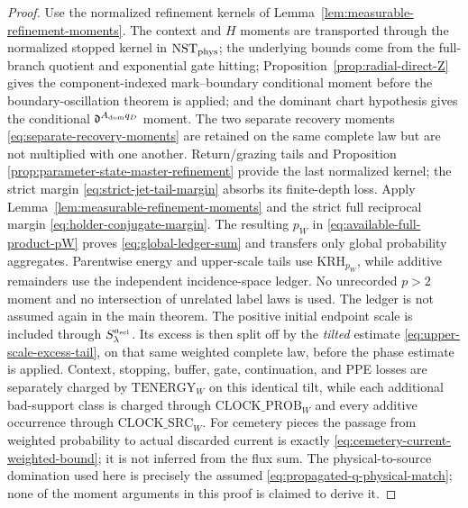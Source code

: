 \documentclass[11pt]{article}
\begin{document}
\begin{proof}
Use the normalized refinement kernels of
Lemma~\ref{lem:measurable-refinement-moments}.  The context and $H$ moments
are transported through the normalized stopped kernel in
$\mathrm{NST}_{\rm phys}$; the underlying bounds come from the full-branch
quotient and exponential gate hitting;
Proposition~\ref{prop:radial-direct-Z} gives the component-indexed
mark--boundary conditional moment before the boundary-oscillation theorem is
applied; and the dominant chart hypothesis gives the conditional
$\mathfrak d^{A_{\rm dom}q_D}$ moment.  The two separate recovery moments
\eqref{eq:separate-recovery-moments} are retained on the same complete law
but are not multiplied with one another.  Return/grazing tails and Proposition
\ref{prop:parameter-state-master-refinement} provide the last normalized
kernel; the strict margin \eqref{eq:strict-jet-tail-margin} absorbs its
finite-depth loss.  Apply Lemma~\ref{lem:measurable-refinement-moments} and
the strict full reciprocal margin \eqref{eq:holder-conjugate-margin}.  The
resulting $p_W$ in \eqref{eq:available-full-product-pW} proves
\eqref{eq:global-ledger-sum} and transfers only global probability
aggregates.  Parentwise energy and upper-scale tails use
$\mathrm{KRH}_{p_W}$, while additive remainders use the independent
incidence-space ledger.  No unrecorded $p>2$ moment and no intersection of
unrelated label laws is used.  The ledger is not assumed again in the main
theorem.
The positive initial endpoint scale is included through
$S_\lambda^{a_{\rm scl}}$.  Its excess is then split off by the
\emph{tilted} estimate \eqref{eq:upper-scale-excess-tail}, on that same
weighted complete law, before the phase estimate is applied.  Context,
stopping, buffer, gate, continuation, and PPE losses are separately charged
by $\mathrm{TENERGY}_{W}$ on this identical tilt, while each additional
bad-support class is charged through $\mathrm{CLOCK\_PROB}_{W}$ and every
additive occurrence through $\mathrm{CLOCK\_SRC}_{W}$.  For cemetery pieces the
passage from weighted probability to actual discarded current is exactly
\eqref{eq:cemetery-current-weighted-bound}; it is not inferred from the
flux sum.
The physical-to-source domination used here is precisely the assumed
\eqref{eq:propagated-q-physical-match}; none of the moment arguments in this
proof is claimed to derive it.
\end{proof}
\end{document}
